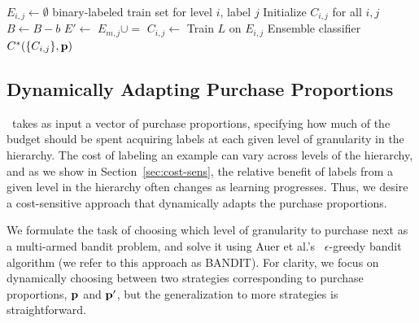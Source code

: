 \documentclass[10pt, conference, compsocconf]{IEEEtran}
\newcommand{\sys}{\Call{Hal}{}} %
\begin{document}
\begin{algorithm}[ht]
\small{
\caption{Method for learning the concept at the root of labeling tree $T$.  
See text for 
Purchase and LabelMap.
}
\label{alg:treetrain}
\begin{algorithmic}
\State  $E_{i,j} \gets \emptyset$  \Comment binary-labeled train set for
level $i$, label $j$
\State Initialize $C_{i,j}$ for all $i, j$
  \State $B \gets B-b$
    \State $E' \gets$ 
           \State $E_{m,j} \cup=$  
       \EndFor
    \EndFor
  \EndFor
    \State $C_{i,j} \gets$ Train $L$ on $E_{i,j}$
  \EndFor
  \EndFor
\EndWhile
\State \Return Ensemble classifier $C^*(\{C_{i,j}\}, {\bf p})$
\EndFunction
\end{algorithmic}
}
\end{algorithm}

\subsection{Dynamically Adapting Purchase Proportions}
\label{sec:adaptive}

\sys\ takes as input a vector of purchase proportions, specifying how much of the budget should be
spent acquiring labels at each given level of granularity in the hierarchy.  The cost of labeling an example can
vary across levels of the hierarchy, and as we show in Section~\ref{sec:cost-sens}, the relative benefit of labels from a given
level in the hierarchy often changes as learning progresses.  Thus, we desire a cost-sensitive approach that dynamically
adapts the purchase proportions.

We formulate the task of choosing which level of granularity to purchase next as a multi-armed bandit problem, and solve it using
Auer et al.'s~\cite{Auer2002} $\epsilon$-greedy bandit algorithm (we refer to
this approach as BANDIT).  For clarity, we focus on dynamically choosing
between two strategies corresponding to purchase proportions, ${\bf p}$ and ${\bf p'}$, but the generalization to more strategies is straightforward.
\end{document}
